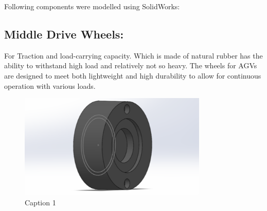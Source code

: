 \documentclass[../../main]{subfiles}
\begin{document}
Following components were modelled using SolidWorks:



  \subsection{Middle Drive Wheels:}
  For Traction and load-carrying capacity. Which is
  made of natural rubber has the ability to withstand high load and
  relatively not so heavy. The wheels for AGVs are designed to meet both
  lightweight and high durability to allow for continuous operation with
  various loads.
  \begin{figure}[h]
    \centering
    \includegraphics[width=0.8\textwidth]{sublatex/Opryrmi/media/image2.png} 
    \caption{Caption 1}
  \end{figure}


\end{document}
